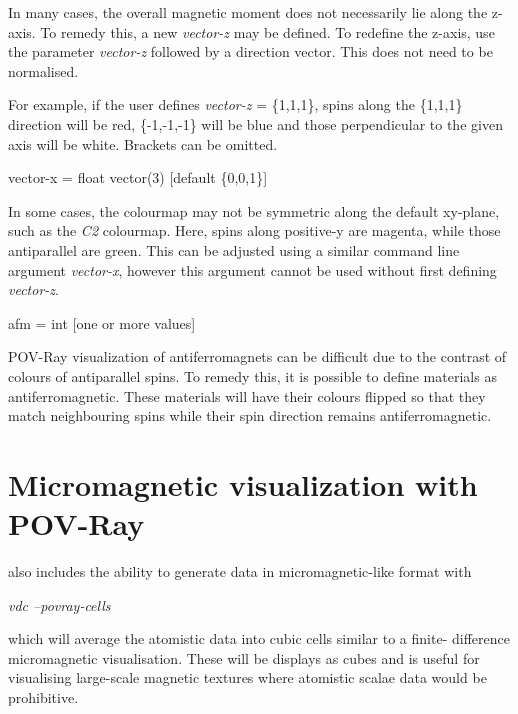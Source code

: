 In many cases, the overall magnetic moment does not necessarily lie along the
z-axis. To remedy this, a new \textit{vector-z} may be defined. To redefine the
z-axis, use the parameter \textit{vector-z} followed by a direction vector. This
does not need to be normalised.

For example, if the user defines \textit{vector-z} = \{1,1,1\}, spins along the
\{1,1,1\} direction will be red, \{-1,-1,-1\} will be blue and those
perpendicular to the given axis will be white. Brackets can be omitted.

{\zicf vector-x = float vector(3) [default \{0,0,1\}]}
 In some cases, the
colourmap may not be symmetric along the default xy-plane, such as the
\textit{C2} colourmap. Here, spins along positive-y are magenta, while those
antiparallel are green. This can be adjusted using a similar command line
argument \textit{vector-x}, however this argument cannot be used without first
defining \textit{vector-z}.

{\zicf afm = int [one or more values] }
 POV-Ray visualization of
antiferromagnets can be difficult due to the contrast of colours of antiparallel
spins. To remedy this, it is possible to define materials as antiferromagnetic.
These materials will have their colours flipped so that they match neighbouring
spins while their spin direction remains antiferromagnetic.

\section*{Micromagnetic visualization with POV-Ray}

\vdc also includes the ability to generate data in micromagnetic-like format
with
\noindent
\begin{minipage}[c]{\textwidth}
\centering
\textit{vdc --povray-cells}
\end{minipage}

which will average the atomistic data into cubic cells similar to a finite-
difference micromagnetic visualisation. These will be displays as cubes and is
useful for visualising large-scale magnetic textures where atomistic scalae data
would be prohibitive.




